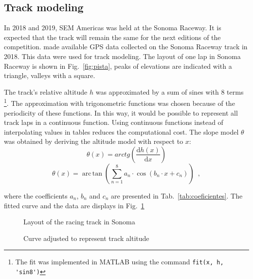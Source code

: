 \subsection{Track modeling}

In 2018 and 2019, SEM Americas was held at the Sonoma Raceway. 
It is expected that the track will remain the same for the next editions of the competition. 
\citet{site:dados_sonoma} made available GPS data collected on the Sonoma Raceway track in 2018. 
This data were used for track modeling. The layout of one lap in Sonoma Raceway is shown in Fig.~\ref{fig:pista}, peaks of elevations are indicated with a triangle, valleys with a square. 

The track’s relative altitude $h$ was approximated by a sum of sines with 8 terms
\footnote{The fit was implemented in MATLAB using the command \lstinline[style=Matlab-editor]{fit(x, h, 'sin8')}}.  
The approximation with trigonometric functions was chosen because of the periodicity of these functions. 
In this way, it would be possible to represent all track laps in a continuous function. 
Using continuous functions instead of interpolating values in tables reduces the computational cost.
The slope model $\theta$ was obtained by deriving the altitude model with respect to $x$:
\[ \theta(x) = arctg\left( \frac{\mathrm{d}h(x)}{\mathrm{d}x}  \right)  \]
\begin{equation}
	\label{eq:modeloTheta}
	\theta(x) = \operatorname{arc\,tan} \left( \sum_{n = 1}^{8} a_n \cdot \cos(b_n \cdot x + c_n) \right)
	\enspace,
\end{equation}

\noindent where the coefficients $a_n$, $b_n$ and $c_n$ are presented in Tab.~\ref{tab:coeficientes}. The fitted curve and the data are displays in Fig.~\ref{fig:altitude_pista}


\begin{figure}[!h]
    \centering
    \begin{minipage}{.5\textwidth}
        \centering
        
        \caption{Layout of the racing track in Sonoma}
        \label{fig:pista}
    \end{minipage}%
    \begin{minipage}{.5\textwidth}
        \centering

        
        \caption{Curve adjusted to represent track altitude}
        \label{fig:altitude_pista}


    \end{minipage}
\end{figure}

